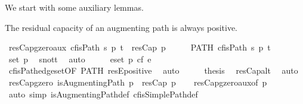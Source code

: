\begin{isabellebody}
\begin{isamarkuptext}
  We start with some auxiliary lemmas.%
\end{isamarkuptext}\isamarkuptrue%
%
\begin{isamarkuptext}%
The residual capacity of an augmenting path is always positive.%
\end{isamarkuptext}\isamarkuptrue%
\isamarkupfalse%
\ resCap{\isacharunderscore}gzero{\isacharunderscore}aux{\isacharcolon}\ {\isachardoublequoteopen}cf{\isachardot}isPath\ s\ p\ t\ {\isasymLongrightarrow}\ {}{\isacharless}resCap\ p{\isachardoublequoteclose}\isanewline
%
\isadelimproof
%
\endisadelimproof
%
\isatagproof
{}\isamarkupfalse%
\ {\isacharminus}\isanewline
\ \ \isamarkupfalse%
\ PATH{\isacharcolon}\ {\isachardoublequoteopen}cf{\isachardot}isPath\ s\ p\ t{\isachardoublequoteclose}\isanewline
\ \ \isamarkupfalse%
\ {\isachardoublequoteopen}set\ p{\isasymnoteq}{\isacharbraceleft}{\isacharbraceright}{\isachardoublequoteclose}\ \isamarkupfalse%
\ s{\isacharunderscore}not{\isacharunderscore}t\ \isamarkupfalse%
\ {\isacharparenleft}auto{\isacharparenright}\isanewline
\ \ \isamarkupfalse%
\ \isamarkupfalse%
\ {\isachardoublequoteopen}{\isasymforall}e{\isasymin}set\ p{\isachardot}\ cf\ e\ {\isachargreater}\ {}{\isachardoublequoteclose}\isanewline
\ \ \ \ \isamarkupfalse%
\ cf{\isachardot}isPath{\isacharunderscore}edgeset{\isacharbrackleft}OF\ PATH{\isacharbrackright}\ resE{\isacharunderscore}positive\ \isamarkupfalse%
\ {\isacharparenleft}auto{\isacharparenright}\isanewline
\ \ \isamarkupfalse%
\ \isamarkupfalse%
\ {\isacharquery}thesis\ \isamarkupfalse%
\ resCap{\isacharunderscore}alt\ \isamarkupfalse%
\ {\isacharparenleft}auto{\isacharparenright}\isanewline
{}\isamarkupfalse%
%
\endisatagproof
{\isafoldproof}%
%
\isadelimproof
\ \isanewline
%
\endisadelimproof
\isanewline
{}\isamarkupfalse%
\ resCap{\isacharunderscore}gzero{\isacharcolon}\ {\isachardoublequoteopen}isAugmentingPath\ p\ {\isasymLongrightarrow}\ {}{\isacharless}resCap\ p{\isachardoublequoteclose}\isanewline
%
\isadelimproof
\ \ %
\endisadelimproof
%
\isatagproof
{}\isamarkupfalse%
\ resCap{\isacharunderscore}gzero{\isacharunderscore}aux{\isacharbrackleft}of\ p{\isacharbrackright}\ \isanewline
\ \ \isamarkupfalse%
\ {\isacharparenleft}auto\ simp{\isacharcolon}\ isAugmentingPath{\isacharunderscore}def\ cf{\isachardot}isSimplePath{\isacharunderscore}def{\isacharparenright}%

\end{isabellebody}

